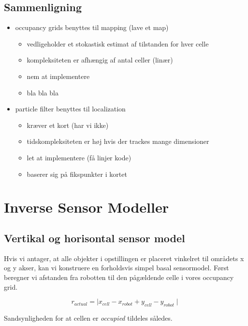 \subsection{Sammenligning}
\begin{itemize}
\item occupancy grids benyttes til mapping (lave et map)
	\begin{itemize}
	\item vedligeholder et stokastisk estimat af tilstanden for hver celle
	\item kompleksiteten er afhængig af antal celler (linær)
	\item nem at implementere
	\item bla bla bla
	\end{itemize}
	
\item particle filter benyttes til localization
	\begin{itemize}
	\item kræver et kort (har vi ikke)
	\item tidskompleksiteten er høj hvis der trackes mange dimensioner
	\item let at implementere (få linjer kode)
	\item baserer sig på fikspunkter i kortet
	\end{itemize}

\end{itemize}



\section{Inverse Sensor Modeller}


\subsection{Vertikal og horisontal sensor model}
Hvis vi antager, at alle objekter i opstillingen er placeret vinkelret til områdets x og y akser,
kan vi konstruere en forholdsvis simpel basal sensormodel.
Først beregner vi afstanden fra robotten til den pågældende celle i vores occupancy grid.

$$r_{actual} = \mid x_{cell} - x_{robot} + y_{cell} - y_{robot} \mid$$

Sandsynligheden for at cellen er  \emph{occupied} tildeles således.

